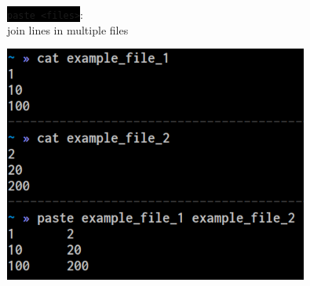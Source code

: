 \documentclass[unknownkeysallowed, 10pt, a4 paper, handout]{beamer}
\newcommand{\code}[1]{\colorbox{black}{\color{green}\texttt{#1}}}
\newcommand{\sidebyside}[5]{
  \begin{minipage}{#1\textwidth}
    #2
  \end{minipage} #3 \begin{minipage}{#4\textwidth}
    #5
  \end{minipage}
}
\begin{document}
\begin{frame}
\begin{center}
    \sidebyside{0.49}{
      \code{paste <files>}:\\
      join lines in multiple files
    }{\hfill}{0.48}{
      \begin{center}
        \includegraphics[width=0.75\textwidth]{pics/paste.png}
      \end{center}
    }
  \end{center}
\end{frame}
\end{document}
